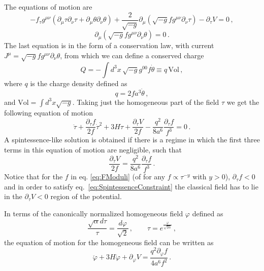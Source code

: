 \documentclass[11pt,a4paper]{article}
\newcommand{\be}{\begin{equation}}
\newcommand{\ee}{\end{equation}}
\begin{document}
The equations of motion are
\begin{equation}
\label{eq:EOMtau}
- f_\tau g^{\mu \nu} \left(\partial_\mu \tau \partial_\nu \tau + \partial_\mu \theta \partial_\nu \theta\right) + \frac{2}{\sqrt{-g}} \partial_\mu \left(\sqrt{-g} f g^{\mu \nu} \partial_\nu \tau\right) - \partial_\tau V = 0 \,,
\end{equation}
\begin{equation}
\label{eq:EOMTheta}
\partial_\mu \left(\sqrt{-g} f g^{\mu \nu} \partial_\nu \theta\right) = 0 \,.
\end{equation}
The last equation is in the form of a conservation law, with current $J^\mu = \sqrt{-g} f g^{\mu \nu} \partial_\nu \theta$, from which we can define a conserved charge
\begin{equation}
Q = - \int d^3x\, \sqrt{-g} g^{00} f \dot\theta \equiv q \, \text{Vol} \,,
\end{equation}
where $q$ is the charge density defined as
\begin{equation}
\label{eq:ChargeDensity}
q = 2 f a^3 \dot\theta \,,
\end{equation}
and $\text{Vol} = \int d^3x \sqrt{-g}$. Taking just the homogeneous part of the field $\tau$ we get the following equation of motion
\begin{equation}
\ddot\tau + \frac{\partial_\tau f}{2 f} \dot\tau^2 + 3 H \dot\tau + \frac{\partial_\tau V}{2 f} - \frac{q^2}{8 a^6} \frac{\partial_\tau f}{f^3} = 0 \,.
\end{equation}
A spintessence-like solution is obtained if there is a regime in which the first three terms in this equation of motion are negligible, such that
\begin{equation}
\label{eq:SpintessenceConstraint}
\frac{\partial_\tau V}{2 f} = \frac{q^2}{8 a^6} \frac{\partial_\tau f}{f^3} \,.
\end{equation}
Notice that for the $f$ in eq. \eqref{eq:FModuli} (of for any $f \propto \tau^{-y}$ with $y > 0$), $\partial_\tau f < 0$ and in order to satisfy eq.~\eqref{eq:SpintessenceConstraint} the classical field has to lie in the $\partial_\tau V < 0$ region of the potential. 

In terms of the canonically normalized homogeneous field $\varphi$ defined as
\begin{equation}
\frac{\sqrt{\alpha} d\tau}{\tau} = \frac{d \varphi}{\sqrt{2}} \,,\qquad  \tau=e^{\frac{\varphi}{\sqrt{2\alpha}}} \,,
\end{equation}
the equation of motion for the homogeneous field can be written as
\be
\ddot{\varphi}+3H\dot{\varphi}+\partial_{\varphi} V=\frac{q^2\partial_\varphi f}{4 a^6 f^2} \,.
\label{FieldEvolution}
\ee
\end{document}
